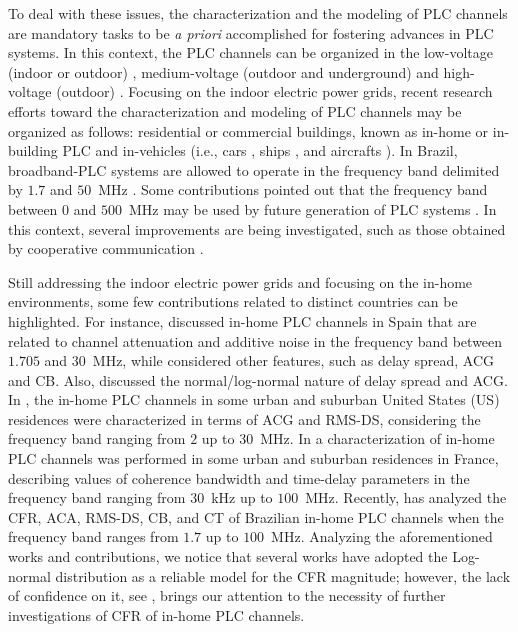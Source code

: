 \documentclass[journal]{IEEEtran}
\begin{document}
To deal with these issues, the characterization and the modeling of \ac{PLC} channels are mandatory tasks to be \textit{a priori} accomplished for fostering advances in \ac{PLC} systems. In this context, the \ac{PLC} channels can be organized in the low-voltage (indoor or outdoor) \cite{Zhai:low}, medium-voltage (outdoor and underground) \cite{Lazaropoulos} and high-voltage (outdoor) \cite{Zajc}.  Focusing on the indoor electric power grids, recent research efforts toward the characterization and modeling of \ac{PLC} channels may be organized as follows: residential or commercial buildings, known as in-home or in-building \ac{PLC} \cite{Amirshahi:PLC,Tlich:Indoor} and in-vehicles (i.e., cars \cite{Vallejo:Vehicle_PLC}, ships \cite{Barmada:Ships_PLC}, and aircrafts \cite{Jones:Aircraft_PLC,Andrey2016}). In Brazil, broadband-\ac{PLC}
systems are allowed to operate in the frequency band delimited by $1.7$ and $50$~MHz \cite{Anatel:PLC}. Some contributions pointed out that the frequency band between $0$ and $500$~MHz may be used by future generation of \ac{PLC} systems \cite{Luis:doc,zeddam1}. In this context, several improvements
are being investigated, such as those obtained by cooperative communication \cite{mateus:2018,Michelle2016,Valencia2014,Roberto2015}.

Still addressing the indoor electric power grids and focusing on the in-home environments, some few contributions related to distinct countries can be highlighted. For instance, \cite{Canete:Model} discussed in-home \ac{PLC} channels in Spain that are related to channel attenuation and additive noise in the frequency band between $1.705$ and $30$~MHz, while \cite{Canete:PLC} considered other features, such as delay spread, \ac{ACG} and \ac{CB}. Also, \cite{Cortes:PLC} discussed the normal/log-normal nature of delay spread and \ac{ACG}. In \cite{GalliUS,Galli:Wireline}, the in-home \ac{PLC} channels in some urban and suburban United States (US) residences were characterized in terms of \ac{ACG} and \ac{RMS-DS}, considering the frequency band ranging from $2$ up to $30$~MHz. In \cite{Tlich:Indoor} a characterization of in-home \ac{PLC} channels was performed in some urban and suburban residences in France, describing values of coherence bandwidth and time-delay parameters in the frequency band ranging from $30$~kHz up to $100$~MHz. Recently, \cite{Thiago:Characterization} has analyzed the \ac{CFR}, \ac{ACA}, \ac{RMS-DS}, \ac{CB}, and \ac{CT} of Brazilian in-home \ac{PLC} channels when the frequency band ranges from $1.7$ up to $100$~MHz. Analyzing the aforementioned works and contributions, we notice that several works have adopted the Log-normal distribution as a reliable model for the \ac{CFR} magnitude; however, the lack of confidence on it, see \cite{Cortes:PLC}, brings our attention to the necessity of further investigations of \ac{CFR} of in-home \ac{PLC} channels. 
\end{document}
